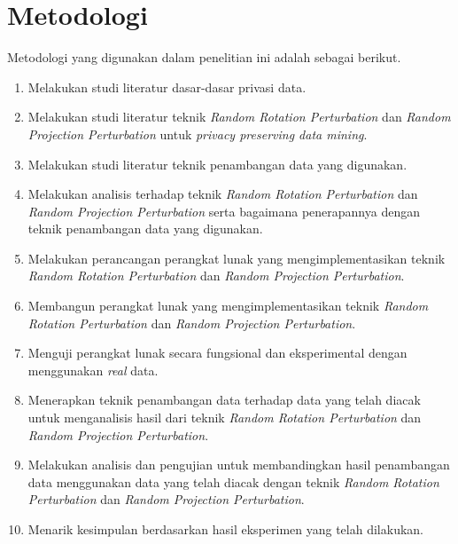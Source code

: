 \section{Metodologi}
\label{sec:metlit}
Metodologi yang digunakan dalam penelitian ini adalah sebagai berikut.
\begin{enumerate}
    \item Melakukan studi literatur dasar-dasar privasi data.
    \item Melakukan studi literatur teknik \textit{Random Rotation Perturbation} dan \textit{Random Projection Perturbation} untuk \textit{privacy preserving data mining}.
    \item Melakukan studi literatur teknik penambangan data yang digunakan.
    \item Melakukan analisis terhadap teknik \textit{Random Rotation Perturbation} dan \textit{Random Projection Perturbation} serta bagaimana penerapannya dengan teknik penambangan data yang digunakan.
    \item Melakukan perancangan perangkat lunak yang mengimplementasikan teknik \textit{Random Rotation Perturbation} dan \textit{Random Projection Perturbation}.
    \item Membangun perangkat lunak yang mengimplementasikan teknik \textit{Random Rotation Perturbation} dan \textit{Random Projection Perturbation}.
    \item Menguji perangkat lunak secara fungsional dan eksperimental dengan menggunakan \textit{real} data.
    \item Menerapkan teknik penambangan data terhadap data yang telah diacak untuk menganalisis hasil dari teknik \textit{Random Rotation Perturbation} dan \textit{Random Projection Perturbation}.
    \item Melakukan analisis dan pengujian untuk membandingkan hasil penambangan data menggunakan data yang telah diacak dengan teknik \textit{Random Rotation Perturbation} dan \textit{Random Projection Perturbation}.
    \item Menarik kesimpulan berdasarkan hasil eksperimen yang telah dilakukan.
\end{enumerate}

